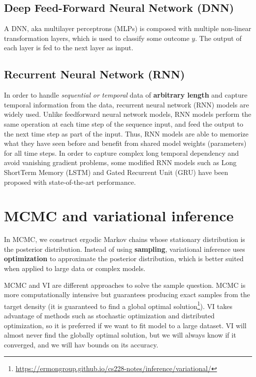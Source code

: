 \documentclass[fontset=fandol,zihao=false,scheme=chinese,heading=true,UTF8]{ctexbook}
\begin{document}
\hypertarget{deep-feed-forward-neural-network-dnn}{%
\section{Deep Feed-Forward Neural Network (DNN)}\label{deep-feed-forward-neural-network-dnn}}

A DNN, aka multilayer perceptrons (MLPs) is composed with multiple non-linear transformation layers, which is used to classify some outcome \(y\).
The output of each layer is fed to the next layer as input.

\hypertarget{recurrent-neural-network-rnn}{%
\section{Recurrent Neural Network (RNN)}\label{recurrent-neural-network-rnn}}

In order to handle \emph{sequential or temporal} data of \textbf{arbitrary length} and capture temporal information from the data, recurrent neural network (RNN) models are widely used.
Unlike feedforward neural network models, RNN models perform the same operation at each time step of the sequence input, and feed the output to the next time step as part of the input.
Thus, RNN models are able to memorize what they have seen before and benefit from shared model weights (parameters) for all time steps.
In order to capture complex long temporal dependency and avoid vanishing gradient problems, some modified RNN models such as Long ShortTerm Memory (LSTM) and Gated Recurrent Unit (GRU) have been proposed with state-of-the-art performance.

\hypertarget{mcmc-and-variational-inference}{%
\chapter{MCMC and variational inference}\label{mcmc-and-variational-inference}}

In MCMC, we construct ergodic Markov chains whose stationary distribution is the posterior distribution. Instead of using \textbf{sampling}, variational inference uses \textbf{optimization} to approximate the posterior distribution, which is better suited when applied to large data or complex models.

MCMC and VI are different approaches to solve the sample question. MCMC is more computationally intensive but guarantees producing exact samples from the target density (it is guaranteed to find a global optimal solution\footnote{\url{https://ermongroup.github.io/cs228-notes/inference/variational/}}). VI takes advantage of methods such as stochastic optimization and distributed optimization, so it is preferred if we want to fit model to a large dataset. VI will almost never find the globally optimal solution, but we will always know if it converged, and we will hav bounds on its accuracy.
\end{document}
